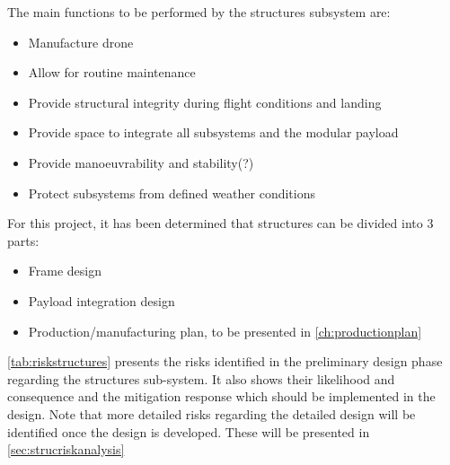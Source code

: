 The main functions to be performed by the structures subsystem are:
\begin{itemize}[noitemsep,nolistsep]
    \item Manufacture drone
    \item Allow for routine maintenance
    \item Provide structural integrity during flight conditions and landing 
    \item Provide space to integrate all subsystems and the modular payload
    \item Provide manoeuvrability and stability(?)
    \item Protect subsystems from defined weather conditions
\end{itemize}
For this project, it has been determined that structures can be divided into 3 parts:
\begin{itemize}[noitemsep,nolistsep]
    \item Frame design
    \item Payload integration design
    \item Production/manufacturing plan, to be presented in \autoref{ch:productionplan}
    
\end{itemize}
\autoref{tab:riskstructures} presents the risks identified in the preliminary design phase regarding the structures sub-system. It also shows their likelihood and consequence and the mitigation response which should be implemented in the design. Note that more detailed risks regarding the detailed design will be identified once the design is developed. These will be presented in \autoref{sec:strucriskanalysis}


